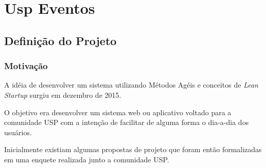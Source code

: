 \chapter{Usp Eventos}
\label{cap:uspeventos}
\section{Definição do Projeto}
\subsection{Motivação}
        \par A idéia de desenvolver um sistema utilizando Métodos Agéis e conceitos de \emph{Lean Startup} surgiu em dezembro de  2015.
	\par O objetivo era  desenvolver um sistema web ou aplicativo voltado para a comunidade USP com a intenção de facilitar de alguma forma o dia-a-dia dos usuários.
        \par Inicialmente existiam algumas propostas de projeto que foram então formalizadas em uma enquete realizada junto a comunidade USP.
